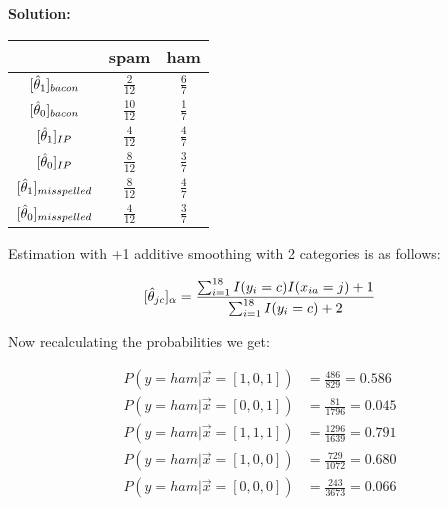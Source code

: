 \documentclass[a4paper]{article}
\begin{document}
\textbf{Solution:}
\begin{center}
\begin{tabular}{|c|c|c|}
\hline
     & spam & ham  \\
     \hline
     $[\Hat{\theta}_{1}]_{bacon}$ & $\frac{2}{12}$ & $\frac{6}{7}$ \\
     \hline
     $[\Hat{\theta}_{0}]_{bacon}$ & $\frac{10}{12}$ & $\frac{1}{7}$ \\
     \hline
     $[\Hat{\theta}_{1}]_{IP}$ & $\frac{4}{12}$ & $\frac{4}{7}$ \\
     \hline
     $[\Hat{\theta}_{0}]_{IP}$ & $\frac{8}{12}$ & $\frac{3}{7}$ \\
     \hline
     $[\Hat{\theta}_{1}]_{misspelled}$ & $\frac{8}{12}$ & $\frac{4}{7}$ \\
     \hline
     $[\Hat{\theta}_{0}]_{misspelled}$ & $\frac{4}{12}$ & $\frac{3}{7}$ \\
     \hline
\end{tabular}
\end{center}

Estimation with +1 additive smoothing with 2 categories is as follows:

 $$[\Hat{\theta}_{jc}]_{\alpha} = \frac{\sum_{i = 1}^{18}I(y_i = c)I(x_{ia} = j) + 1}{\sum_{i=1}^{18}I(y_i = c) + 2}$$
 
 Now recalculating the probabilities we get:
 
 

\begin{align*}
P(y = ham | \vec{x} = [1,0,1]) &= \frac{486}{829} = 0.586 \\ 
P(y = ham | \vec{x} = [0,0,1]) &= \frac{81}{1796} = 0.045 \\
P(y = ham | \vec{x} = [1,1,1]) &= \frac{1296}{1639} = 0.791 \\ 
P(y = ham | \vec{x} = [1,0,0]) &= \frac{729}{1072} = 0.680\\
P(y = ham | \vec{x} = [0,0,0]) &= \frac{243}{3673} = 0.066 \\
\end{align*}

\end{document}
